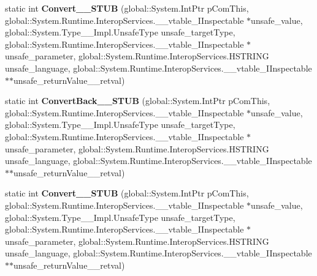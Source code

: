 \begin{DoxyCompactItemize}
\item 
\mbox{\label{struct_windows_1_1_u_i_1_1_xaml_1_1_data_1_1_i_value_converter_____impl_1_1_vtbl_aad498aa18051b0397a2382c868b62168}} 
static int {\bfseries Convert\+\_\+\+\_\+\+S\+T\+UB} (global\+::\+System.\+Int\+Ptr p\+Com\+This, global\+::\+System.\+Runtime.\+Interop\+Services.\+\_\+\+\_\+vtable\+\_\+\+I\+Inspectable $\ast$unsafe\+\_\+value, global\+::\+System.\+Type\+\_\+\+\_\+\+Impl.\+Unsafe\+Type unsafe\+\_\+target\+Type, global\+::\+System.\+Runtime.\+Interop\+Services.\+\_\+\+\_\+vtable\+\_\+\+I\+Inspectable $\ast$unsafe\+\_\+parameter, global\+::\+System.\+Runtime.\+Interop\+Services.\+H\+S\+T\+R\+I\+NG unsafe\+\_\+language, global\+::\+System.\+Runtime.\+Interop\+Services.\+\_\+\+\_\+vtable\+\_\+\+I\+Inspectable $\ast$$\ast$unsafe\+\_\+return\+Value\+\_\+\+\_\+retval)
\item 
\mbox{\label{struct_windows_1_1_u_i_1_1_xaml_1_1_data_1_1_i_value_converter_____impl_1_1_vtbl_ad8c751d6dd6e13f3655511062d880c14}} 
static int {\bfseries Convert\+Back\+\_\+\+\_\+\+S\+T\+UB} (global\+::\+System.\+Int\+Ptr p\+Com\+This, global\+::\+System.\+Runtime.\+Interop\+Services.\+\_\+\+\_\+vtable\+\_\+\+I\+Inspectable $\ast$unsafe\+\_\+value, global\+::\+System.\+Type\+\_\+\+\_\+\+Impl.\+Unsafe\+Type unsafe\+\_\+target\+Type, global\+::\+System.\+Runtime.\+Interop\+Services.\+\_\+\+\_\+vtable\+\_\+\+I\+Inspectable $\ast$unsafe\+\_\+parameter, global\+::\+System.\+Runtime.\+Interop\+Services.\+H\+S\+T\+R\+I\+NG unsafe\+\_\+language, global\+::\+System.\+Runtime.\+Interop\+Services.\+\_\+\+\_\+vtable\+\_\+\+I\+Inspectable $\ast$$\ast$unsafe\+\_\+return\+Value\+\_\+\+\_\+retval)
\item 
\mbox{\label{struct_windows_1_1_u_i_1_1_xaml_1_1_data_1_1_i_value_converter_____impl_1_1_vtbl_aad498aa18051b0397a2382c868b62168}} 
static int {\bfseries Convert\+\_\+\+\_\+\+S\+T\+UB} (global\+::\+System.\+Int\+Ptr p\+Com\+This, global\+::\+System.\+Runtime.\+Interop\+Services.\+\_\+\+\_\+vtable\+\_\+\+I\+Inspectable $\ast$unsafe\+\_\+value, global\+::\+System.\+Type\+\_\+\+\_\+\+Impl.\+Unsafe\+Type unsafe\+\_\+target\+Type, global\+::\+System.\+Runtime.\+Interop\+Services.\+\_\+\+\_\+vtable\+\_\+\+I\+Inspectable $\ast$unsafe\+\_\+parameter, global\+::\+System.\+Runtime.\+Interop\+Services.\+H\+S\+T\+R\+I\+NG unsafe\+\_\+language, global\+::\+System.\+Runtime.\+Interop\+Services.\+\_\+\+\_\+vtable\+\_\+\+I\+Inspectable $\ast$$\ast$unsafe\+\_\+return\+Value\+\_\+\+\_\+retval)
$$
\end{DoxyCompactItemize}
